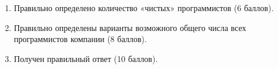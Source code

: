 

\markSection

\begin{enumerate}
    \item Правильно определено количество «чистых» программистов (6 баллов). 
    \item Правильно определены варианты возможного общего числа всех программистов компании (8 баллов). 
    \item Получен правильный ответ (10 баллов).
\end{enumerate}
